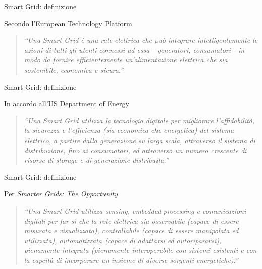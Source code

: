 \begin{frame}{Smart Grid: definizione}
\begin{block}{Secondo l’European Technology Platform}
\begin{quote}
\textit{``Una Smart Grid è una rete elettrica che può integrare intelligentemente le azioni di tutti gli utenti connessi ad essa - generatori, consumatori - in modo da fornire efficientemente un’alimentazione elettrica che sia sostenibile, economica e sicura.”}
\end{quote}
\end{block}
\end{frame}

\begin{frame}{Smart Grid: definizione}
\begin{block}{In accordo all’US Department of Energy}
\begin{quote}
\textit{``Una Smart Grid utilizza la tecnologia digitale per migliorare l’affidabilità, la sicurezza e l’efficienza (sia economica che energetica) del sistema elettrico, a partire dalla generazione su larga scala, attraverso il sistema di distribuzione, fino ai consumatori, ed attraverso un numero crescente di risorse di storage e di generazione distribuita.”}
\end{quote}
\end{block}
\end{frame}


\begin{frame}{Smart Grid: definizione}
\begin{block}{Per \textit{Smarter Grids: The Opportunity}}
\begin{quote}
\textit{``Una Smart Grid utilizza sensing, embedded processing e comunicazioni digitali per far sì che la rete elettrica sia osservabile (capace di essere misurata e visualizzata), controllabile (capace di essere manipolata ed utilizzata), automatizzata (capace di adattarsi ed autoripararsi), pienamente integrata (pienamente interoperabile con sistemi esistenti e con la capcità di incorporare un insieme di diverse sorgenti energetiche).”}
\end{quote}
\end{block}
\end{frame}


